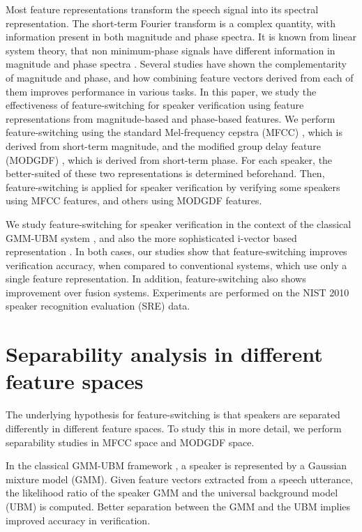 \documentclass{article}
\begin{document}
Most feature representations transform the speech signal into its spectral
representation. The short-term Fourier transform is a complex quantity, with
information present in both magnitude and phase spectra. It is known from linear
system theory, that non minimum-phase signals have different information in
magnitude and phase spectra \cite{oppenheim}. Several studies \cite{mgd_complement}
have shown the complementarity of magnitude and phase, and how combining feature
vectors derived from each of them improves performance in various tasks. In this
paper, we study the effectiveness of feature-switching for speaker verification
using feature representations from magnitude-based and phase-based features. We
perform feature-switching using the standard Mel-frequency cepstra (MFCC)
\cite{mfcc}, which is derived from short-term magnitude, and the modified group delay feature
(MODGDF) \cite{hegdeModgdf}, which is derived from short-term phase. For each speaker, the
better-suited of these two representations is determined beforehand. Then,
feature-switching is applied for speaker verification by verifying some speakers
using MFCC features, and others using MODGDF features.

We study feature-switching for speaker verification in the context of the
classical GMM-UBM system \cite{reynoldsAdaptedGMM}, and also the more
sophisticated i-vector based representation \cite{dehak_ivector}. In both cases,
our studies show that feature-switching improves verification accuracy, when
compared to conventional systems, which use only a single feature
representation. In addition, feature-switching also shows improvement over
fusion systems. Experiments are performed on the NIST 2010 speaker recognition
evaluation (SRE) \cite{nist2010SRE} data.


\section{Separability analysis in different feature spaces}
\label{sec:separability}
The underlying hypothesis for feature-switching is that speakers are separated
differently in different feature spaces. To study this in more detail, we
perform separability studies in MFCC space and MODGDF space.

In the classical GMM-UBM framework \cite{reynoldsAdaptedGMM}, a speaker is
represented by a Gaussian mixture model (GMM). Given feature vectors extracted
from a speech utterance, the likelihood ratio of the speaker GMM and the
universal background model (UBM) is computed. Better separation between the GMM
and the UBM implies improved accuracy in verification.
\end{document}
